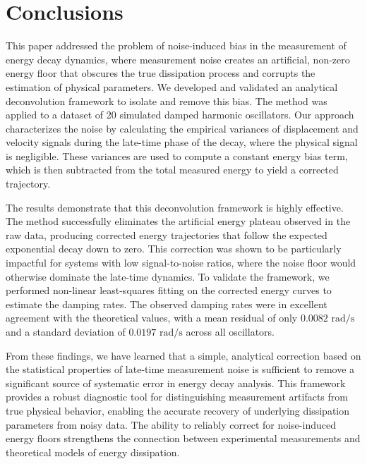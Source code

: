 \documentclass[]{article}
\begin{document}
\section{Conclusions}
\label{sec:conclusions}
This paper addressed the problem of noise-induced bias in the measurement of energy decay dynamics, where measurement noise creates an artificial, non-zero energy floor that obscures the true dissipation process and corrupts the estimation of physical parameters. We developed and validated an analytical deconvolution framework to isolate and remove this bias. The method was applied to a dataset of 20 simulated damped harmonic oscillators. Our approach characterizes the noise by calculating the empirical variances of displacement and velocity signals during the late-time phase of the decay, where the physical signal is negligible. These variances are used to compute a constant energy bias term, which is then subtracted from the total measured energy to yield a corrected trajectory.

The results demonstrate that this deconvolution framework is highly effective. The method successfully eliminates the artificial energy plateau observed in the raw data, producing corrected energy trajectories that follow the expected exponential decay down to zero. This correction was shown to be particularly impactful for systems with low signal-to-noise ratios, where the noise floor would otherwise dominate the late-time dynamics. To validate the framework, we performed non-linear least-squares fitting on the corrected energy curves to estimate the damping rates. The observed damping rates were in excellent agreement with the theoretical values, with a mean residual of only $0.0082 \text{ rad/s}$ and a standard deviation of $0.0197 \text{ rad/s}$ across all oscillators.

From these findings, we have learned that a simple, analytical correction based on the statistical properties of late-time measurement noise is sufficient to remove a significant source of systematic error in energy decay analysis. This framework provides a robust diagnostic tool for distinguishing measurement artifacts from true physical behavior, enabling the accurate recovery of underlying dissipation parameters from noisy data. The ability to reliably correct for noise-induced energy floors strengthens the connection between experimental measurements and theoretical models of energy dissipation.


{}

\end{document}
